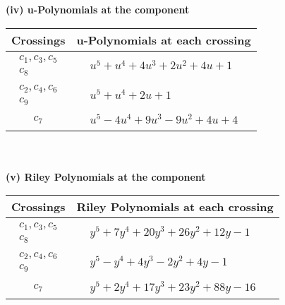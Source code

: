 \documentclass[1p]{elsarticle_modified}
\theoremstyle{definition}
\begin{document}
\newpage\renewcommand{\arraystretch}{1}
\flushleft \textbf{(iv) u-Polynomials at the component}\newline \\
\begin{tabular}{m{50pt}|m{274pt}}
Crossings & \hspace{64pt}u-Polynomials at each crossing \\
\hline $$\begin{aligned}c_{1},c_{3},c_{5}\\c_{8}\end{aligned}$$&$\begin{aligned}
&u^5+u^4+4 u^3+2 u^2+4 u+1
\end{aligned}$\\
\hline $$\begin{aligned}c_{2},c_{4},c_{6}\\c_{9}\end{aligned}$$&$\begin{aligned}
&u^5+u^4+2 u+1
\end{aligned}$\\
\hline $$\begin{aligned}c_{7}\end{aligned}$$&$\begin{aligned}
&u^5-4 u^4+9 u^3-9 u^2+4 u+4
\end{aligned}$\\
\hline
\end{tabular}\\~\\
\newpage\renewcommand{\arraystretch}{1}
\flushleft \textbf{(v) Riley Polynomials at the component}\newline \\
\begin{tabular}{m{50pt}|m{274pt}}
Crossings & \hspace{64pt}Riley Polynomials at each crossing \\
\hline $$\begin{aligned}c_{1},c_{3},c_{5}\\c_{8}\end{aligned}$$&$\begin{aligned}
&y^5+7 y^4+20 y^3+26 y^2+12 y-1
\end{aligned}$\\
\hline $$\begin{aligned}c_{2},c_{4},c_{6}\\c_{9}\end{aligned}$$&$\begin{aligned}
&y^5- y^4+4 y^3-2 y^2+4 y-1
\end{aligned}$\\
\hline $$\begin{aligned}c_{7}\end{aligned}$$&$\begin{aligned}
&y^5+2 y^4+17 y^3+23 y^2+88 y-16
\end{aligned}$\\
\hline
\end{tabular}\\~\\
\end{document}
